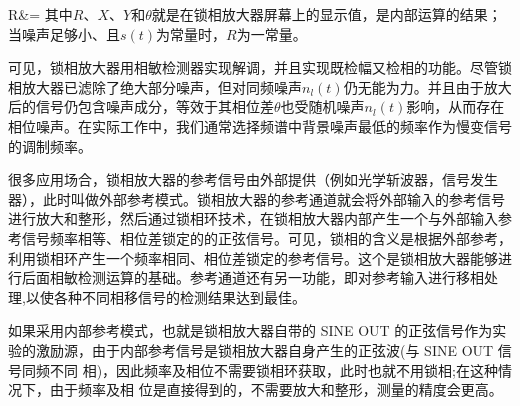 \documentclass[11pt,a4paper]{ctexart}
\begin{document}
R&=
\eea
其中$R$、$X$、$Y$和$\theta$就是在锁相放大器屏幕上的显示值，是内部运算的结果；当噪声足够小、且$s(t)$为常量时，$R$为一常量。
\par
可见，锁相放大器用相敏检测器实现解调，并且实现既检幅又检相的功能。尽管锁相放大器已滤除了绝大部分噪声，但对同频噪声$n_l (t)$仍无能为力。并且由于放大后的信号仍包含噪声成分，等效于其相位差$\theta$也受随机噪声$n_l (t)$影响，从而存在相位噪声。在实际工作中，我们通常选择频谱中背景噪声最低的频率作为慢变信号的调制频率。\par
很多应用场合，锁相放大器的参考信号由外部提供（例如光学斩波器，信号发生器），此时叫做外部参考模式。锁相放大器的参考通道就会将外部输入的参考信号进行放大和整形，然后通过锁相环技术，在锁相放大器内部产生一个与外部输入参考信号频率相等、相位差锁定的的正弦信号。可见，锁相的含义是根据外部参考，利用锁相环产生一个频率相同、相位差锁定的参考信号。这个是锁相放大器能够进行后面相敏检测运算的基础。参考通道还有另一功能，即对参考输入进行移相处理,以使各种不同相移信号的检测结果达到最佳。
\par
如果采用内部参考模式，也就是锁相放大器自带的 SINE OUT 的正弦信号作为实 验的激励源，由于内部参考信号是锁相放大器自身产生的正弦波(与 SINE OUT 信号同频不同 相)，因此频率及相位不需要锁相环获取，此时也就不用锁相;在这种情况下，由于频率及相 位是直接得到的，不需要放大和整形，测量的精度会更高。
\par
\end{document}
